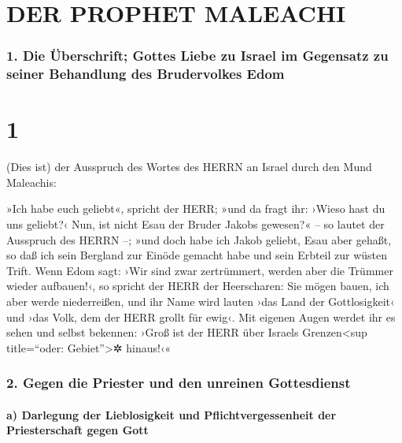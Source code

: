 \hypertarget{der-prophet-maleachi}{%
\section{DER PROPHET MALEACHI}\label{der-prophet-maleachi}}

\hypertarget{die-uxfcberschrift-gottes-liebe-zu-israel-im-gegensatz-zu-seiner-behandlung-des-brudervolkes-edom}{%
\subsubsection{1. Die Überschrift; Gottes Liebe zu Israel im Gegensatz
zu seiner Behandlung des Brudervolkes
Edom}\label{die-uxfcberschrift-gottes-liebe-zu-israel-im-gegensatz-zu-seiner-behandlung-des-brudervolkes-edom}}

\hypertarget{section}{%
\section{1}\label{section}}

 (Dies ist) der Ausspruch des Wortes des HERRN an Israel
durch den Mund Maleachis:

 »Ich habe euch geliebt«, spricht der HERR; »und da fragt
ihr: ›Wieso hast du uns geliebt?‹ Nun, ist nicht Esau der Bruder Jakobs
gewesen?« -- so lautet der Ausspruch des HERRN --; »und doch habe ich
Jakob geliebt,  Esau aber gehaßt, so daß ich sein Bergland
zur Einöde gemacht habe und sein Erbteil zur wüsten Trift.
 Wenn Edom sagt: ›Wir sind zwar zertrümmert, werden aber
die Trümmer wieder aufbauen!‹, so spricht der HERR der Heerscharen: Sie
mögen bauen, ich aber werde niederreißen, und ihr Name wird lauten ›das
Land der Gottlosigkeit‹ und ›das Volk, dem der HERR grollt für ewig‹.
 Mit eigenen Augen werdet ihr es sehen und selbst
bekennen: ›Groß ist der HERR über Israels Grenzen\textless sup
title=``oder: Gebiet''\textgreater✲ hinaus!‹«

\hypertarget{gegen-die-priester-und-den-unreinen-gottesdienst}{%
\subsubsection{2. Gegen die Priester und den unreinen
Gottesdienst}\label{gegen-die-priester-und-den-unreinen-gottesdienst}}

\hypertarget{a-darlegung-der-lieblosigkeit-und-pflichtvergessenheit-der-priesterschaft-gegen-gott}{%
\paragraph{a) Darlegung der Lieblosigkeit und Pflichtvergessenheit der
Priesterschaft gegen
Gott}\label{a-darlegung-der-lieblosigkeit-und-pflichtvergessenheit-der-priesterschaft-gegen-gott}}

